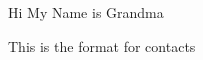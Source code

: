 \documentclass[char]{LRSguildcamp1}
\begin{document}
\name{\cGrandma{}}
Hi My Name is Grandma

\begin{itemz}[Goals]
	\item 
\end{itemz}

\begin{itemz}[Notes]
	\item 
\end{itemz}

\begin{contacts}
	\contact{} This is the format for contacts 
\end{contacts}
\end{document}

